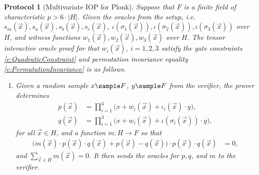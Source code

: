 \documentclass[11pt]{article}
\newtheorem{protocol}[]{Protocol}
\theoremstyle{definition}
\theoremstyle{remark}
\begin{document}
\begin{protocol}[Multivariate IOP for Plonk]
\label{p:Plonk}
Suppose that $F$ is a finite field of characteristic $p > 6\cdot |H|$.
Given the oracles from the setup, i.e. $s_m(\vec x), s_a(\vec x), s_b(\vec x), s_c(\vec x)$, $\iota(\sigma_{1}(\vec x)),\iota(\sigma_{2}(\vec x)), \iota(\sigma_{3}(\vec x))$  over $H$,  and witness functions $w_1(\vec x), w_2(\vec x), w_3(\vec x)$ over $H$.
The tensor interactive oracle proof for that $w_i(\vec x)$, $i=1,2,3$ satisfy the gate constraints \eqref{e:QuadraticConstraint} and permutation invariance equality \eqref{e:PermutationInvariance} is as follows.
\begin{enumerate} 
\item
\label{i:PAstep1}
Given a random sample $x \sample F$, $y\sample F$ from the verifier, the prover determines 
\begin{align}
p(\vec x) &= \prod_{i=1}^3 \big( x + w_i(\vec x) + \iota_i(\vec x)\cdot y \big),
\\
q(\vec x) &= \prod_{i=1}^3 \big( x + w_i(\vec x) + \iota\left(\sigma_i (\vec x)\right)\cdot  y\big),
\end{align}
for all $\vec x\in H$, and a function $m: H\rightarrow F$ so that
\begin{align} 
\label{e:m}
\Big(
m(\vec x)\cdot p(\vec x) \cdot q(\vec x)  + p(\vec x) - q(\vec x)\Big)
\cdot  p(\vec x)\cdot q(\vec x) &= 0,
\end{align}
and  $\sum_{\vec x\in H} m(\vec x) = 0$.
It then sends the oracles for $p,q$, and $m$ to the verifier.


\end{enumerate}
\end{protocol}
\end{document}
